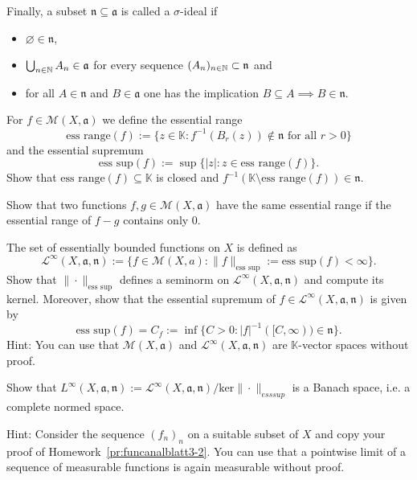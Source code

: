\begin{Problem}
	Finally, a subset $\mathfrak{n}\subseteq \mathfrak{a}$ is called a $\sigma$-ideal if
	\begin{itemize}
		\item $\varnothing \in \mathfrak{n}$,
		\item $\bigcup_{n\in \mathbb{N}} A_n\in \mathfrak{a}$ for every sequence $(A_n)_{n\in \mathbb{N}}\subset \mathfrak{n}$ and
		\item for all $A\in \mathfrak{n}$ and $B\in\mathfrak{a}$ one has the implication $B\subseteq A\implies B \in \mathfrak{n}$.
	\end{itemize}
	\begin{parts}
	\item For $f\in \mathcal{M}(X, \mathfrak{a})$ we define the essential range
		\[
			\text{ess range}(f):=\{z\in \mathbb{K}:f^{-1}(B_r(z))\not\in \mathfrak{n}\text{ for all }r>0\} 
		\]
		and the essential supremum
		\[
			\text{ess sup}(f):=\sup \{|z|:z\in \text{ess range}(f)\} 
		.\] 
		Show that $\text{ess range}(f)\subseteq \mathbb{K}$ is closed and $f^{-1}(\mathbb{K}\setminus\text{ess range}(f))\in \mathfrak{n}$.
	\item Show that two functions $f,g\in \mathcal{M}(X, \mathfrak{a})$ have the same essential range if the essential range of $f-g$ contains only $0$.
	\item The set of essentially bounded functions on $X$ is defined as
		\[
			\mathcal{L}^\infty (X, \mathfrak{a}, \mathfrak{n}):=\{f\in \mathcal{M}(X, a):\|f\|_\text{ess sup}:=\text{ess sup}(f)<\infty\} 
		.\] 
		Show that $\|\cdot\|_\text{ess sup}$ defines a seminorm on $\mathcal{L}^\infty(X, \mathfrak{a}, \mathfrak{n})$ and compute its kernel. Moreover, show that the essential supremum of $f\in \mathcal{L}^\infty(X, \mathfrak{a}, \mathfrak{n})$ is given by
		\[
			\text{ess sup}(f)=C_f:=\inf \{C>0:|f|^{-1}([C,\infty))\in \mathfrak{n}\}  
		.\] 
		Hint: You can use that $\mathcal{M}(X, \mathfrak{a})$ and $\mathcal{L}^\infty(X, \mathfrak{a}, \mathfrak{n})$ are $\mathbb{K}$-vector spaces without proof.
	\item Show that $L^\infty(X, \mathfrak{a}, \mathfrak{n}):= \mathcal{L}^\infty (X, \mathfrak{a}, \mathfrak{n}) / \text{ker}\|\cdot\|_{ess sup}$ is a Banach space, i.e. a complete normed space.

		Hint: Consider the sequence $(f_n)_n$ on a suitable subset of $X$ and copy your proof of Homework~\ref{pr:funcanalblatt3-2}. You can use that a pointwise limit of a sequence of measurable functions is again measurable without proof.
	\end{parts}
\end{Problem}

